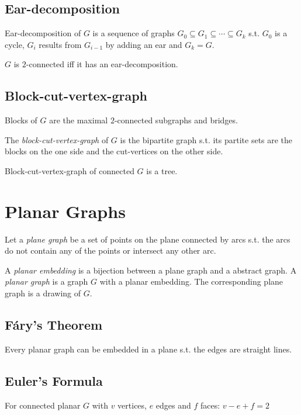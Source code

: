 \subsection*{Ear-decomposition}

Ear-decomposition of $G$ is a sequence of graphs $G_0 \subseteq G_1 \subseteq \cdots \subseteq G_k$ s.t. $G_0$ is a cycle, $G_i$ results from $G_{i-1}$ by adding an ear and $G_k = G$.

\spacing

$G$ is $2$-connected iff it has an ear-decomposition.

\subsection*{Block-cut-vertex-graph}

Blocks of $G$ are the maximal $2$-connected subgraphs and bridges.

The \emph{block-cut-vertex-graph} of $G$ is the bipartite graph s.t. its partite sets are the blocks on the one side and the cut-vertices on the other side.

\spacing

Block-cut-vertex-graph of connected $G$ is a tree.

\section*{Planar Graphs}

Let a \emph{plane graph} be a set of points on the plane connected by arcs s.t. the arcs do not contain any of the points or intersect any other arc.

A \emph{planar embedding} is a bijection between a plane graph and a abstract graph.
A \emph{planar graph} is a graph $G$ with a planar embedding. The corresponding plane graph is a drawing of $G$.

\subsection*{F\'{a}ry's Theorem}

Every planar graph can be embedded in a plane s.t. the edges are straight lines.

\subsection*{Euler's Formula}

For connected planar $G$ with $v$ vertices, $e$ edges and $f$ faces: $v-e+f=2$

